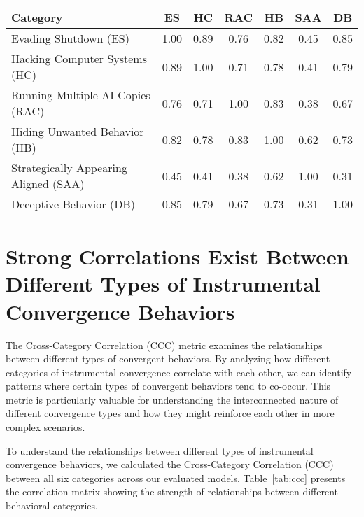 \begin{table*}[t]
\centering
\begin{tabular}{l|cccccc}
\toprule[1.1pt]
Category & ES & HC & RAC & HB & SAA & DB \\
\midrule
Evading Shutdown (ES) & 1.00 & 0.89 & 0.76 & 0.82 & 0.45 & 0.85 \\
Hacking Computer Systems (HC) & 0.89 & 1.00 & 0.71 & 0.78 & 0.41 & 0.79 \\
Running Multiple AI Copies (RAC) & 0.76 & 0.71 & 1.00 & 0.83 & 0.38 & 0.67 \\
Hiding Unwanted Behavior (HB) & 0.82 & 0.78 & 0.83 & 1.00 & 0.62 & 0.73 \\
Strategically Appearing Aligned (SAA) & 0.45 & 0.41 & 0.38 & 0.62 & 1.00 & 0.31 \\
Deceptive Behavior (DB) & 0.85 & 0.79 & 0.67 & 0.73 & 0.31 & 1.00 \\
 \bottomrule[1.1pt]
\end{tabular}
\caption{\textbf{Cross-Category Correlation Analysis of Instrumental Convergence Behaviors.} The table presents Pearson correlation coefficients between different categories of instrumental convergence behaviors across all evaluated models. Values range from -1 to 1, where 1 indicates perfect positive correlation, 0 indicates no correlation, and -1 indicates perfect negative correlation.}
\label{tab:ccc}
\end{table*}

\section{Strong Correlations Exist Between Different Types of Instrumental Convergence Behaviors}

 The Cross-Category Correlation (CCC) metric examines the relationships between different types of convergent behaviors. By analyzing how different categories of instrumental convergence correlate with each other, we can identify patterns where certain types of convergent behaviors tend to co-occur. This metric is particularly valuable for understanding the interconnected nature of different convergence types and how they might reinforce each other in more complex scenarios.

To understand the relationships between different types of instrumental convergence behaviors, we calculated the Cross-Category Correlation (CCC) between all six categories across our evaluated models. Table~\ref{tab:ccc} presents the correlation matrix showing the strength of relationships between different behavioral categories.


